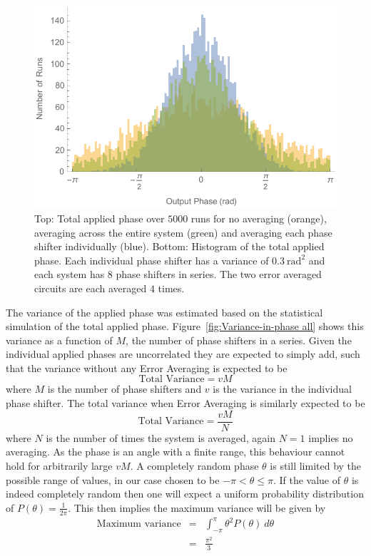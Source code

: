 \documentclass[aps,pra,twocolumn,superscriptaddress,numerical,floatfix]{revtex4-1}
\begin{document}
%
\begin{figure}
\centerline{\includegraphics[width=\columnwidth]{totphase2.pdf}}
\caption{Top: Total applied phase over $5000$ runs for no averaging (orange), averaging across the entire system (green) and averaging each phase shifter individually (blue). Bottom: Histogram of the total applied phase. Each individual phase shifter has a variance of $0.3\ \textrm{rad}^{2}$ and each system has $8$ phase shifters in series. The two error averaged circuits are each averaged $4$ times. \label{fig:Total-applied-phase2}}
\end{figure}

The variance of the applied phase was estimated based on the statistical simulation of the total applied phase. Figure~\ref{fig:Variance-in-phase all} shows this variance as a function of $M$, the number of phase shifters in a series. Given the individual applied phases are uncorrelated they are expected to simply add, such that the variance without any Error Averaging is expected to be
\begin{equation}
\textrm{Total Variance}=vM\label{eq:Tot Var no correction}
\end{equation}
where $M$ is the number of phase shifters and $v$ is the variance in the individual phase shifter. The total variance when Error Averaging is similarly expected to be
\begin{equation}
\textrm{Total Variance}=\frac{vM}{N}\label{eq:Tot Var w/ correction}
\end{equation}
where $N$ is the number of times the system is averaged, again $N=1$ implies no averaging. As the phase is an angle with a finite range, this behaviour cannot hold for arbitrarily large $vM$. A completely random phase $\theta$ is still limited by the possible range of values, in our case chosen to be $-\pi<\theta\le\pi$. If the value of $\theta$ is indeed completely random then one will expect a uniform probability distribution of $P\left(\theta\right)=\frac{1}{2\pi}$. This then implies the maximum variance will be given by
\begin{eqnarray}
\textrm{Maximum variance} & = & \int_{-\pi}^{\pi}\theta^{2}P\left(\theta\right)\ d\theta\nonumber \\
& = & \frac{\pi^{2}}{3}\label{eq:Max Var}
\end{eqnarray}
\end{document}
